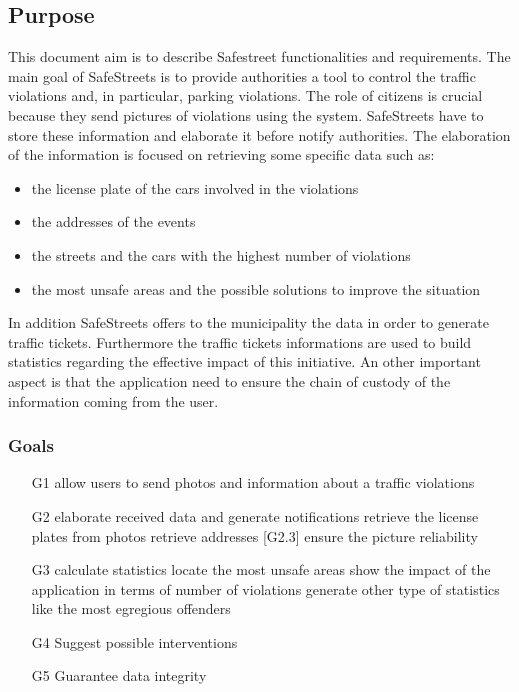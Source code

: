 \subsection{Purpose}
This document aim is to describe Safestreet functionalities and requirements.
The main goal of SafeStreets is to provide authorities a tool to control the traffic violations and, in particular, parking violations. The role of citizens is crucial because they send pictures of violations using the system. SafeStreets have to store these information and elaborate it before notify authorities.
The elaboration of the information is focused on retrieving some specific data such as:
\begin{itemize}
	\item
	the license plate of the cars involved in the violations
	\item
	the addresses of the events
	\item 
	the streets and the cars with the highest number of violations
	\item 
	the most unsafe areas and the possible solutions to improve the situation
\end{itemize}
In addition SafeStreets offers to the municipality the data in order to generate traffic tickets. Furthermore the traffic tickets informations are used to build statistics regarding the effective impact of this initiative.
An other important aspect is that the application need to ensure the chain of custody of the information coming from the user.
\subsubsection{Goals}
\begin{itemize}
	\item
	[G1] allow users to send photos and information about a traffic violations
	\item 
	[G2] elaborate received data and generate notifications
		\subitem 
		[G2.1] retrieve the license plates from photos
		\subitem
		[G2.2] retrieve addresses
		[G2.3] ensure the picture reliability
	\item
	[G3] calculate statistics
		\subitem
		[G3.1] locate the most unsafe areas
		\subitem
		[G3.2] show the impact of the application in terms of number of violations
		\subitem
		[G3.3] generate other type of statistics like the most egregious offenders
	\item
	[G4] Suggest possible interventions
	\item
	[G5] Guarantee data integrity
		
\end{itemize}
